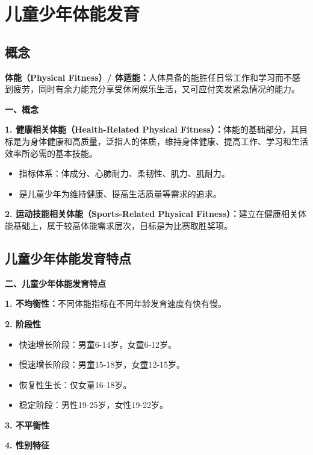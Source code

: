 \section{儿童少年体能发育}

\subsection{概念}

\begin{keybox}
\textbf{体能（Physical Fitness）/ 体适能：}人体具备的能胜任日常工作和学习而不感到疲劳，同时有余力能充分享受休闲娱乐生活，又可应付突发紧急情况的能力。

\textbf{一、概念}

\textbf{1. 健康相关体能（Health-Related Physical Fitness）：}体能的基础部分，其目标是为身体健康和高质量，泛指人的体质，维持身体健康、提高工作、学习和生活效率所必需的基本技能。
\begin{itemize}[leftmargin=*]
    \item 指标体系：体成分、心肺耐力、柔韧性、肌力、肌耐力。
    \item 是儿童少年为维持健康、提高生活质量等需求的追求。
\end{itemize}

\textbf{2. 运动技能相关体能（Sports-Related Physical Fitness）：}建立在健康相关体能基础上，属于较高体能需求层次，目标是为比赛取胜奖项。
\end{keybox}

\subsection{儿童少年体能发育特点}

\begin{keybox}
\textbf{二、儿童少年体能发育特点}

\textbf{1. 不均衡性：}不同体能指标在不同年龄发育速度有快有慢。

\textbf{2. 阶段性}
\begin{itemize}[leftmargin=*]
    \item 快速增长阶段：男童6-14岁，女童6-12岁。
    \item 慢速增长阶段：男童15-18岁，女童12-15岁。
    \item 恢复性生长：仅女童16-18岁。
    \item 稳定阶段：男性19-25岁，女性19-22岁。
\end{itemize}

\textbf{3. 不平衡性}

\textbf{4. 性别特征}
\end{keybox}

